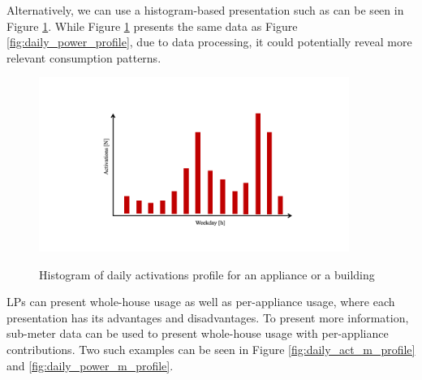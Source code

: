 Alternatively, we can use a histogram-based presentation such as can be seen in Figure \ref{fig:daily_act_profile}.
While Figure \ref{fig:daily_act_profile} presents the same data as Figure \ref{fig:daily_power_profile},
due to data processing, it could potentially reveal more relevant consumption patterns.

\begin{figure}[H]
	\centering
	\caption{Histogram of daily activations profile for an appliance or a building}
	\includegraphics[width=0.9\textwidth]{Figures/profile_sketches/Slide5.png}
	\label{fig:daily_act_profile}
\end{figure}

LPs can present whole-house usage as well as per-appliance usage, where each presentation has its advantages and disadvantages. 
To present more information, sub-meter data can be used to present whole-house usage with per-appliance contributions.
Two such examples can be seen in Figure \ref{fig:daily_act_m_profile} and \ref{fig:daily_power_m_profile}.

